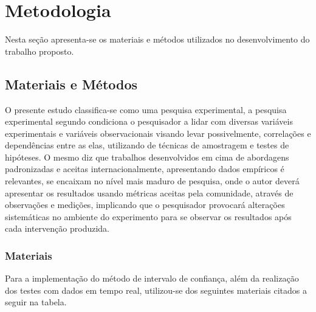 

\chapter{Metodologia}\label{cap:metodologia}
Nesta seção apresenta-se os materiais e métodos utilizados no desenvolvimento do trabalho proposto.
\section{Materiais e Métodos}

O presente estudo classifica-se como uma pesquisa experimental, a pesquisa experimental segundo \cite{wazlawick2017metodologia} condiciona o pesquisador a lidar com diversas variáveis experimentais e variáveis observacionais visando levar possivelmente, correlações e dependências entre as elas, utilizando de técnicas de amostragem e testes de hipóteses. O mesmo diz que trabalhos desenvolvidos em cima de abordagens padronizadas e aceitas internacionalmente, apresentando dados empíricos é relevantes, se encaixam no nível mais maduro de pesquisa, onde o autor deverá apresentar os resultados usando métricas aceitas pela comunidade, através de observações e medições, implicando que o pesquisador provocará alterações sistemáticas no ambiente do experimento para se observar os resultados após cada intervenção produzida.

\subsection{Materiais}

Para a implementação do método de intervalo de confiança, além da realização dos testes com dados em tempo real, utilizou-se dos seguintes materiais citados a seguir na tabela.

